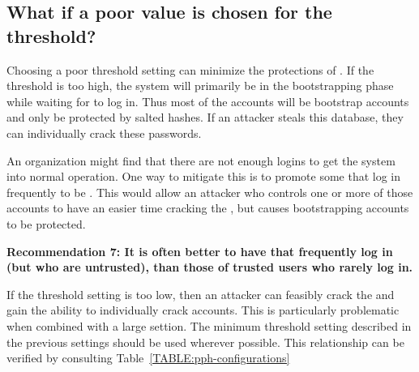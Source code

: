 \subsection{What if a poor value is chosen for the threshold?}

Choosing a poor threshold setting can minimize the protections of \PPH.
If the threshold is too high, the system will primarily be in the 
bootstrapping phase while waiting for \thresholdaccounts to log in.  
Thus most of the accounts will be bootstrap accounts and only be protected 
by salted hashes.  If an attacker steals this database, they can individually 
crack these passwords.

An organization might find that there are not enough \thresholdaccount logins to get
the system into normal operation.   One way to mitigate this is to promote 
some \thresholdlessaccounts that log in frequently to be \thresholdaccounts.  
This would allow an attacker who controls one or more of those accounts to
have an easier time cracking the \thresholdaccounts, but causes bootstrapping
accounts to be protected.

{\bf Recommendation 7: It is often better to have \thresholdaccounts that 
frequently log in (but who are untrusted), than those of trusted users
who rarely log in.} 

If the threshold setting is too low, then an attacker can feasibly crack
the \thresholdaccounts and gain the ability to individually crack accounts.
This is particularly problematic when combined with a large \partialbytes
settion.  The minimum threshold setting described in the previous
settings should be used wherever possible. This relationship can be verified 
by consulting Table~\ref{TABLE:pph-configurations}



%

